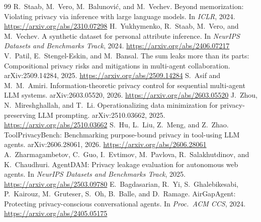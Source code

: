 \documentclass[11pt]{article}
\begin{document}
\begin{thebibliography}{99}
 R.~Staab, M.~Vero, M.~Balunovi\'c, and M.~Vechev. Beyond memorization: Violating privacy via inference with large language models. In \emph{ICLR}, 2024. \url{https://arxiv.org/abs/2310.07298}
 H.~Yukhymenko, R.~Staab, M.~Vero, and M.~Vechev. A synthetic dataset for personal attribute inference. In \emph{NeurIPS Datasets and Benchmarks Track}, 2024. \url{https://arxiv.org/abs/2406.07217}
 V.~Patil, E.~Stengel-Eskin, and M.~Bansal. The sum leaks more than its parts: Compositional privacy risks and mitigations in multi-agent collaboration. arXiv:2509.14284, 2025. \url{https://arxiv.org/abs/2509.14284}
 S.~Asif and M.~M.~Amiri. Information-theoretic privacy control for sequential multi-agent LLM systems. arXiv:2603.05520, 2026. \url{https://arxiv.org/abs/2603.05520}
 J.~Zhou, N.~Mireshghallah, and T.~Li. Operationalizing data minimization for privacy-preserving LLM prompting. arXiv:2510.03662, 2025. \url{https://arxiv.org/abs/2510.03662}
 S.~Hu, L.~Liu, Z.~Meng, and Z.~Zhao. ToolPrivacyBench: Benchmarking purpose-bound privacy in tool-using LLM agents. arXiv:2606.28061, 2026. \url{https://arxiv.org/abs/2606.28061}
 A.~Zharmagambetov, C.~Guo, I.~Evtimov, M.~Pavlova, R.~Salakhutdinov, and K.~Chaudhuri. AgentDAM: Privacy leakage evaluation for autonomous web agents. In \emph{NeurIPS Datasets and Benchmarks Track}, 2025. \url{https://arxiv.org/abs/2503.09780}
 E.~Bagdasarian, R.~Yi, S.~Ghalebikesabi, P.~Kairouz, M.~Gruteser, S.~Oh, B.~Balle, and D.~Ramage. AirGapAgent: Protecting privacy-conscious conversational agents. In \emph{Proc.\ ACM CCS}, 2024. \url{https://arxiv.org/abs/2405.05175}
\end{thebibliography}
\end{document}
